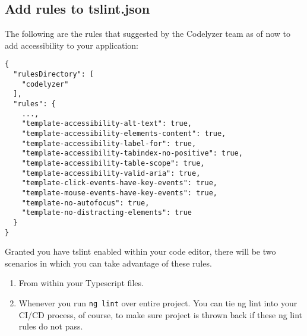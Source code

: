 \subsection{Add rules to tslint.json}
The following are the rules that suggested by the Codelyzer team as of now to add accessibility to your application: 
\begin{lstlisting}
{
  "rulesDirectory": [
    "codelyzer"
  ],
  "rules": {
    ...,
    "template-accessibility-alt-text": true,
    "template-accessibility-elements-content": true,
    "template-accessibility-label-for": true,
    "template-accessibility-tabindex-no-positive": true,
    "template-accessibility-table-scope": true,
    "template-accessibility-valid-aria": true,
    "template-click-events-have-key-events": true,
    "template-mouse-events-have-key-events": true,
    "template-no-autofocus": true,
    "template-no-distracting-elements": true
  }
}  
\end{lstlisting}

Granted you have tslint enabled within your code editor, there will be two scenarios in which you can take advantage of these rules. 
\begin{enumerate}
  \item From within your Typescript files.
  \item Whenever you run \lstinline{ng lint} over entire project. You can tie ng lint into your CI/CD process, of course, to make sure project is thrown back if these ng lint rules do not pass. 
\end{enumerate}


